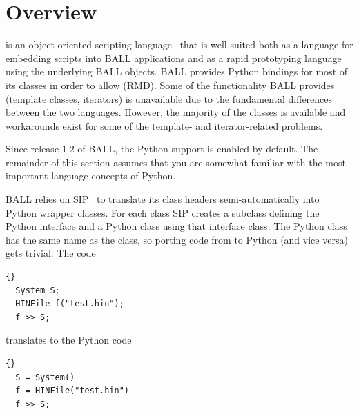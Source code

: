 \noindent
{}
\vspace{1em}

\section{Overview}

 is an object-oriented scripting language~\cite{Python} that is
well-suited both as a language for embedding scripts into BALL applications and
as a rapid prototyping language using the underlying BALL objects.
BALL provides Python bindings for most of its classes in order to allow 
 (RMD). Some of the functionality BALL 
provides (\eg template classes, iterators) is unavailable due to the 
fundamental differences between the two languages. However, the majority of 
the classes is available and workarounds exist for some of the template- and 
iterator-related problems.

Since release 1.2 of BALL, the Python support is enabled by default. The 
remainder of this section assumes that you are somewhat familiar with the most
important language concepts of Python.

BALL relies on SIP~\cite{SIP}  to translate its class
headers semi-automatically into Python wrapper classes. For each \CPP class
SIP creates a subclass defining the Python interface and a Python class
using that \CPP interface class. The Python class has the same name as the
\CPP class, so porting code from \CPP to Python (and vice versa) gets trivial.
The \CPP code 

\begin{lstlisting}{}
  System S;
  HINFile f("test.hin");
  f >> S;
\end{lstlisting}

\noindent
translates to the Python code

\begin{lstlisting}{}
  S = System()
  f = HINFile("test.hin")
  f >> S;
\end{lstlisting}

